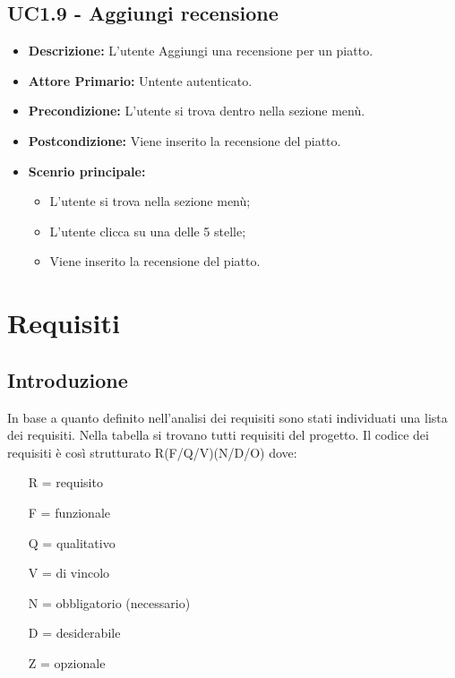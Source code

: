 \subsection{UC1.9 - Aggiungi recensione}
\begin{itemize}
    \item \textbf{Descrizione:} L'utente Aggiungi una recensione per un piatto.
    \item \textbf{Attore Primario:} Untente autenticato.
    \item \textbf{Precondizione:} L'utente si trova dentro nella sezione menù.
    \item \textbf{Postcondizione:} Viene inserito la recensione del piatto.
    \item \textbf{Scenrio principale:}
    \begin{itemize}
        \item L'utente si trova nella sezione menù;
        \item L'utente clicca su una delle 5 stelle;
        \item Viene inserito la recensione del piatto.
    \end{itemize}
\end{itemize}


\section{Requisiti}
\subsection{Introduzione}
In base a quanto definito nell'analisi dei requisiti sono stati individuati una lista dei requisiti. Nella tabella si trovano tutti requisiti del progetto.
Il codice dei requisiti è così strutturato R(F/Q/V)(N/D/O) dove:
\begin{enumerate}
	\item[R =] requisito
    \item[F =] funzionale
    \item[Q =] qualitativo
    \item[V =] di vincolo
    \item[N =] obbligatorio (necessario)
    \item[D =] desiderabile
    \item[Z =] opzionale
\end{enumerate}
